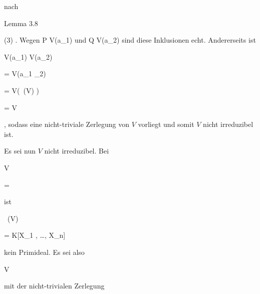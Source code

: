 {{{{ } {
}


{ } {
}


}
{}{}{}
nach

Lemma 3.8

 (3)
.
Wegen
\mathkor {} {P \not\in V({\mathfrak a}_1)} {und} {Q \not\in V({\mathfrak a}_2)} {}
sind diese Inklusionen echt. Andererseits ist


\mavergleichskettedisp


{\vergleichskette


{ V({\mathfrak a}_1) \cup V({\mathfrak a}_2)
}


{ =} { V({\mathfrak a}_1 _2)
}


{ =} { V(  \,(V)  )
}


{ =} { V
}


{ } {
}


}
{}{}{,}
sodass eine nicht-triviale Zerlegung von $V$ vorliegt und somit $V$ nicht irreduzibel ist.}


{}
\teilbeweis {}{}{}


{Es sei nun $V$ nicht irreduzibel. Bei


\mavergleichskette


{\vergleichskette


{ V
}


{ = }{ \emptyset
}


{  }{
}


{    }{
}


{   }{
}


}
{}{}{}
ist


\mavergleichskette


{\vergleichskette


{ \, (V)
}


{ = }{ K[X_1 , \ldots , X_n]
}


{  }{
}


{    }{
}


{   }{
}


}
{}{}{}
kein Primideal. Es sei also


\mavergleichskette


{\vergleichskette


{ V
}


{ \neq }{ \emptyset
}


{  }{
}


{    }{
}


{   }{
}


}
{}{}{}
mit der nicht-trivialen Zerlegung


\mavergleichskette


}}
